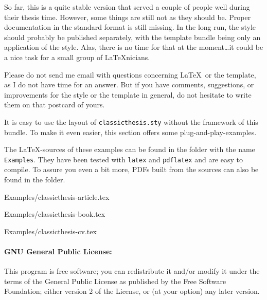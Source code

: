 So far, this is a quite stable version that served a couple of people
well during their thesis time. However, some things are still not as
they should be. Proper documentation in the standard format is still
missing. In the long run, the style should probably be published
separately, with the template bundle being only an application of the
style. Alas, there is no time for that at the moment\dots it could be
a nice task for a small group of \LaTeX nicians.

Please do not send me email with questions concerning \LaTeX\ or the
template, as I do not have time for an answer. But if you have
comments, suggestions, or improvements for the style or the template
in general, do not hesitate to write them on that postcard of yours.


It is easy to use the layout of \texttt{classicthesis.sty} without the
framework of this bundle. To make it even easier, this section offers 
some plug-and-play-examples.

The \LaTeX -sources of these examples can be found in the folder 
with the name \texttt{Examples}. They have been tested with  
\texttt{latex} and \texttt{pdflatex} and are easy to compile. To 
assure you even a bit more, PDFs built from the sources can also 
be found in the folder. 

%
    {Examples/classicthesis-article.tex}
    
%
    {Examples/classicthesis-book.tex}

%
    {Examples/classicthesis-cv.tex}


\paragraph{GNU General Public License:} This program is free software;
you can redistribute it and/or modify
 it under the terms of the  General Public License as
 published by
 the Free Software Foundation; either version 2 of the License, or
 (at your option) any later version.


